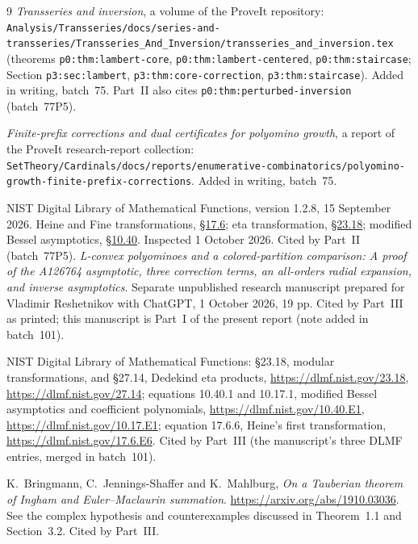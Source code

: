 \documentclass[11pt]{article}
\numberwithin{equation}{section}
\theoremstyle{definition}\newtheorem{definition}[theorem]{Definition}
\theoremstyle{remark}\newtheorem{remark}[theorem]{Remark}
\begin{document}
\begin{thebibliography}{9}
\emph{Transseries and inversion}, a volume of the ProveIt repository:
\nolinkurl{Analysis/Transseries/docs/series-and-transseries/Transseries_And_Inversion/transseries_and_inversion.tex}
(theorems \texttt{p0:thm:lambert-core}, \texttt{p0:thm:lambert-centered},
\texttt{p0:thm:staircase}; Section \texttt{p3:sec:lambert},
\texttt{p3:thm:core-correction}, \texttt{p3:thm:staircase}). Added in
writing, batch~75. Part~II also cites \texttt{p0:thm:perturbed-inversion}
(batch~77P5).

\emph{Finite-prefix corrections and dual certificates for polyomino growth},
a report of the ProveIt research-report collection:
\nolinkurl{SetTheory/Cardinals/docs/reports/enumerative-combinatorics/polyomino-growth-finite-prefix-corrections}.
Added in writing, batch~75.

NIST Digital Library of Mathematical Functions, version 1.2.8, 15 September 2026. Heine and Fine transformations, \href{https://dlmf.nist.gov/17.6}{\S17.6}; eta transformation, \href{https://dlmf.nist.gov/23.18}{\S23.18}; modified Bessel asymptotics, \href{https://dlmf.nist.gov/10.40}{\S10.40}. Inspected 1 October 2026. Cited by Part~II (batch~77P5).
\emph{L-convex polyominoes and a colored-partition comparison: A proof of
the A126764 asymptotic, three correction terms, an all-orders radial
expansion, and inverse asymptotics}. Separate unpublished research
manuscript prepared for Vladimir Reshetnikov with ChatGPT, 1 October 2026,
19 pp. Cited by Part~III as printed; this manuscript is Part~I of the
present report (note added in batch~101).

NIST Digital Library of Mathematical Functions: \S23.18, modular
transformations, and \S27.14, Dedekind eta products,
\url{https://dlmf.nist.gov/23.18}, \url{https://dlmf.nist.gov/27.14};
equations 10.40.1 and 10.17.1, modified Bessel asymptotics and coefficient
polynomials, \url{https://dlmf.nist.gov/10.40.E1},
\url{https://dlmf.nist.gov/10.17.E1}; equation 17.6.6, Heine's first
transformation, \url{https://dlmf.nist.gov/17.6.E6}. Cited by Part~III (the
manuscript's three DLMF entries, merged in batch~101).

K.~Bringmann, C.~Jennings-Shaffer and K.~Mahlburg, \emph{On a Tauberian
theorem of Ingham and Euler--Maclaurin summation}.
\url{https://arxiv.org/abs/1910.03036}. See the complex hypothesis and
counterexamples discussed in Theorem~1.1 and Section~3.2. Cited by
Part~III.


\end{thebibliography}
\end{document}
